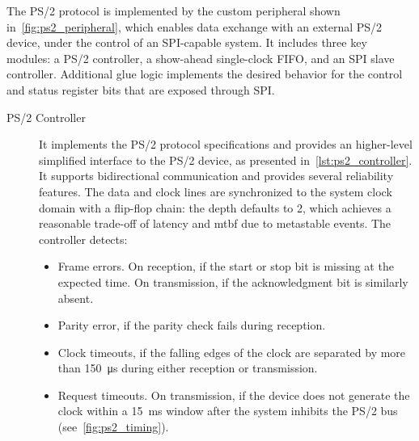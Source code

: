 The PS/2 protocol is implemented by the custom peripheral shown in~\cref{fig:ps2_peripheral}, which enables data exchange with an external PS/2 device, under the control of an SPI-capable system. It includes three key modules: a PS/2 controller, a show-ahead single-clock FIFO, and an SPI slave controller. Additional glue logic implements the desired behavior for the control and status register bits that are exposed through SPI.

\begin{description}
    \item[PS/2 Controller] It implements the PS/2 protocol specifications and provides an higher-level simplified interface to the PS/2 device, as presented in~\cref{lst:ps2_controller}. It supports bidirectional communication and provides several reliability features. The data and clock lines are synchronized to the system clock domain with a flip-flop chain: the depth defaults to 2, which achieves a reasonable trade-off of latency and \ac{mtbf} due to metastable events. The controller detects:
    \begin{itemize}
        \item Frame errors. On reception, if the start or stop bit is missing at the expected time. On transmission, if the acknowledgment bit is similarly absent.
        \item Parity error, if the parity check fails during reception.
        \item Clock timeouts, if the falling edges of the clock are separated by more than \qty{150}{\micro\s} during either reception or transmission.
        \item Request timeouts. On transmission, if the device does not generate the clock within a \qty{15}{\milli\s} window after the system inhibits the PS/2 bus (see~\cref{fig:ps2_timing}).
    \end{itemize}
    

\end{description}
